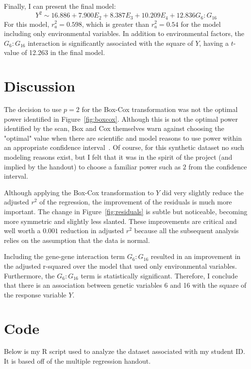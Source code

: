 \documentclass[12pt, letterpaper]{article}
\begin{document}
Finally, I can present the final model:
\begin{equation}
    Y^2 \sim 16.886 + 7.900 E_2 + 8.387 E_3 + 10.209 E_4 + 12.836 G_6:G_{16}
\end{equation}
For this model, \(r_a^2 = 0.598\), which is greater than \(r_a^2 = 0.54\) for the model including only environmental variables.
In addition to environmental factors, the \(G_6:G_{16}\) interaction is significantly associated with the square of \(Y\), having a \(t\)-value of 12.263 in the final model.

\section{Discussion}
The decision to use \(p = 2\) for the Box-Cox transformation was not the optimal power identified in Figure~\ref{fig:boxcox}.
Although this is not the optimal power identified by the scan, Box and Cox themselves warn against choosing the "optimal" value when there are scientific and model reasons to use power within an appropriate confidence interval~\cite{boxcox}.
Of course, for this synthetic dataset no such modeling reasons exist, but I felt that it was in the spirit of the project (and implied by the handout) to choose a familiar power such as \(2\) from the confidence interval.

Although applying the Box-Cox transformation to \(Y\) did very slightly reduce the adjusted \(r^2\) of the regression, the improvement of the residuals is much more important.
The change in Figure~\ref{fig:residuals} is subtle but noticeable, becoming more symmetric and slightly less slanted.
These improvements are critical and well worth a \(0.001\) reduction in adjusted \(r^2\) because all the subsequent analysis relies on the assumption that the data is normal.

Including the gene-gene interaction term \(G_6:G_{16}\) resulted in an improvement in the adjusted r-squared over the model that used only environmental variables.
Furthermore, the \(G_6:G_{16}\) term is statistically significant.
Therefore, I conclude that there is an association between genetic variables 6 and 16 with the square of the response variable \(Y\).

\printbibliography

\appendix
\section{Code}
Below is my R script used to analyze the dataset associated with my student ID.
It is based off of the multiple regression handout.


\end{document}
